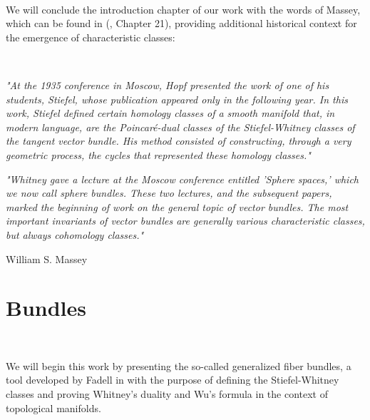 \documentclass[12pt,oneside]{book}
\begin{document}
    \
    
    We will conclude the introduction chapter of our work with the words of Massey, which can be found 
    in (\cite{james}, Chapter 21), providing additional historical context for the emergence of 
    characteristic classes:

    \

    \begin{center}
        \begin{minipage}{12cm}
            \textit{"At the 1935 conference in Moscow, Hopf presented the work of one of his students, 
            Stiefel, whose publication appeared only in the following year. In this work, Stiefel 
            defined certain homology classes of a smooth manifold that, in modern language, are the 
            Poincaré-dual classes of the Stiefel-Whitney classes of the tangent vector bundle. His 
            method consisted of constructing, through a very geometric process, the cycles that 
            represented these homology classes."}
        \end{minipage}
    \end{center}

    \vspace{0.5cm}

    \begin{center}
        \begin{minipage}{12cm}
            \textit{"Whitney gave a lecture at the Moscow conference entitled 'Sphere spaces,' which we 
            now call sphere bundles. These two lectures, and the subsequent papers, marked the beginning 
            of work on the general topic of vector bundles. The most important invariants of vector 
            bundles are generally various characteristic classes, but always cohomology classes."}
            \begin{flushright}
                William S. Massey
            \end{flushright}
        \end{minipage}
    \end{center}

    

    \chapter{Bundles}\label{cap_fib}
    \thispagestyle{empty}

    \

    We will begin this work by presenting the so-called generalized fiber bundles, a 
    tool developed by Fadell in \cite{fadell_1} with the purpose of defining the Stiefel-Whitney 
    classes and proving Whitney's duality and Wu's 
    formula in the context of topological manifolds.
\end{document}
